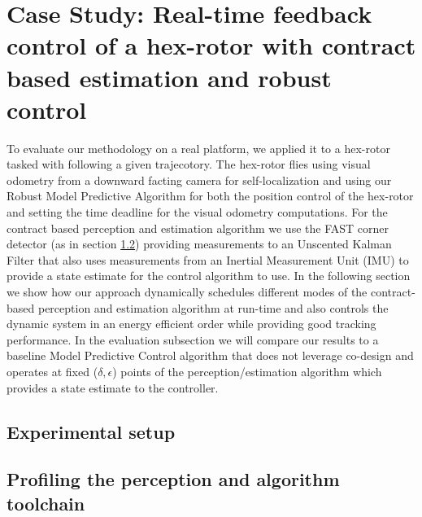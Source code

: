 \section{Case Study: Real-time feedback control of a hex-rotor with contract based estimation and robust control}
\label{experiments}

To evaluate our methodology on a real platform, we applied it to a hex-rotor tasked with following a given trajecotory. The hex-rotor flies using visual odometry from a downward facting camera for self-localization and using our Robust Model Predictive Algorithm for both the position control of the hex-rotor and setting the time deadline for the visual odometry computations. For the contract based perception and estimation algorithm we use the FAST corner detector (as in section \ref{}) providing measurements to an Unscented Kalman Filter that also uses measurements from an Inertial Measurement Unit (IMU) to provide a state estimate for the control algorithm to use.
In the following section we show how our approach dynamically schedules different modes of the contract-based perception and estimation algorithm at run-time and also controls the dynamic system in an energy efficient order while providing good tracking performance. In the evaluation subsection we will compare our results to a baseline Model Predictive Control algorithm that does not leverage co-design and operates at fixed ($\delta,\epsilon$) points of the perception/estimation algorithm which provides a state estimate to the controller. 

\subsection{Experimental setup}


\subsection{Profiling the perception and algorithm toolchain}

